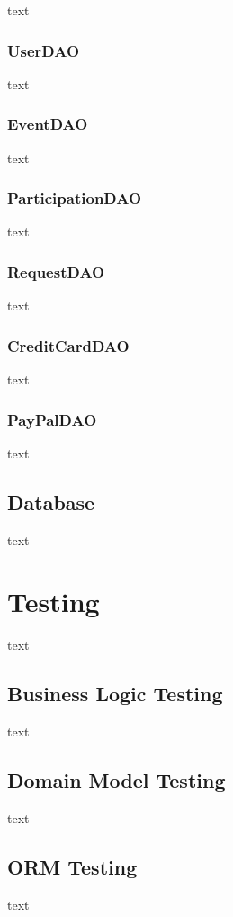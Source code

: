 \documentclass[11pt]{article}
\begin{document}
                text

            \subsubsection{UserDAO} \label{subsubsec:user-dao}

                text

            \subsubsection{EventDAO} \label{subsubsec:event-dao}

                text

            \subsubsection{ParticipationDAO} \label{subsubsec:participation-dao}

                text

            \subsubsection{RequestDAO} \label{subsubsec:request-dao}

                text

            \subsubsection{CreditCardDAO} \label{subsubsec:credit-card-dao}

                text

            \subsubsection{PayPalDAO} \label{subsubsec:paypal-dao}

                text

        \subsection{Database} \label{subsec:database}

            text

    \section{Testing} \label{sec:testing}

        text

        \subsection{Business Logic Testing} \label{subsec:business-logic-testing}

            text

        \subsection{Domain Model Testing} \label{subsec:domain-model-testing}

            text

        \subsection{ORM Testing} \label{subsec:orm-testing}

            text
\end{document}
